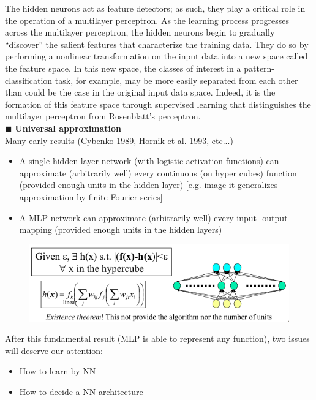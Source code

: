 \documentclass[../main.tex]{subfiles}
\begin{document}
The hidden neurons act as feature detectors; as such, they play a critical role in the operation of a multilayer perceptron. As the learning process progresses across the multilayer perceptron, the hidden neurons begin to gradually “discover” the salient features that characterize the training data. They do so by performing a nonlinear transformation on the input data into a new space called the feature space. In this new space, the classes of interest in a pattern-classification task, for example, may be more easily separated from each other than could be the case in the original input data space. Indeed, it is the formation of this feature space through supervised learning that distinguishes the multilayer perceptron from Rosenblatt’s perceptron.\\

\noindent$\blacksquare$ \textbf{Universal approximation}\\
Many early results (Cybenko 1989, Hornik et al. 1993, etc...)
\begin{itemize}
    \item A single hidden-layer network (with logistic activation functions) can approximate (arbitrarily well) every continuous (on hyper cubes) function (provided enough units in the hidden layer) [e.g. image it generalizes approximation by finite Fourier series]
    
    \item A MLP network can approximate (arbitrarily well) every input- output mapping (provided enough units in the hidden layers)
\end{itemize}
\begin{figure}[H]
    \centering
    \includegraphics[scale = 0.5]{lectures/4_neural_networks/4_universal_approximation.png}
\end{figure}
After this fundamental result (MLP is able to represent any function), two issues will deserve our attention:
\begin{itemize}
    \item How to learn by NN
    \item How to decide a NN architecture
\end{itemize}
\end{document}
